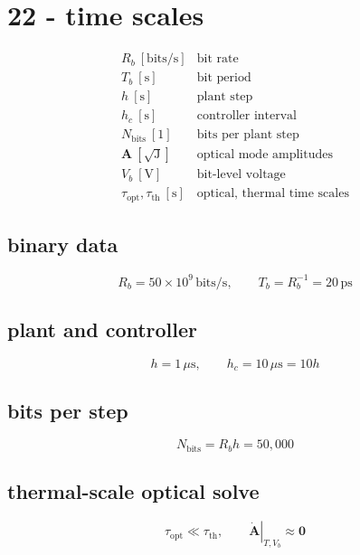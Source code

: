 \section*{22 - time scales}

\[
\begin{array}{ll}R_b\ [\mathrm{bits/s}]&\text{bit rate}\\[0.6em]T_b\ [\mathrm s]&\text{bit period}\\[0.6em]h\ [\mathrm s]&\text{plant step}\\[0.6em]h_c\ [\mathrm s]&\text{controller interval}\\[0.6em]N_{\mathrm{bits}}\ [1]&\text{bits per plant step}\\[0.6em]\mathbf A\ [\sqrt{\mathrm J}]&\text{optical mode amplitudes}\\[0.6em]V_b\ [\mathrm V]&\text{bit-level voltage}\\[0.6em]\tau_{\mathrm{opt}},\tau_{\mathrm{th}}\ [\mathrm s]&\text{optical, thermal time scales}\end{array}
\]

\subsection*{binary data}
\[
\displaystyle R_b=50\times10^9\,\mathrm{bits/s},\qquad T_b=R_b^{-1}=20\,\mathrm{ps}
\]

\subsection*{plant and controller}
\[
\displaystyle h=1\,\mu\mathrm s,\qquad h_c=10\,\mu\mathrm s=10h
\]

\subsection*{bits per step}
\[
\displaystyle N_{\mathrm{bits}}=R_bh=50{,}000
\]

\subsection*{thermal-scale optical solve}
\[
\displaystyle \tau_{\mathrm{opt}}\ll\tau_{\mathrm{th}},\qquad\left.\dot{\mathbf A}\right|_{T,V_b}\approx\mathbf0
\]
